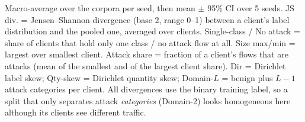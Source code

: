 \begin{table}[t]
\caption{Measured heterogeneity of the client partitions (10 clients) used by the FedAvg runs.}
\label{tab:partition_heterogeneity}
\centering
\small
\setlength{\tabcolsep}{3pt}
\par\smallskip
{\footnotesize Macro-average over the corpora per seed, then mean $\pm$ 95\% CI over 5 seeds. JS div. = Jensen--Shannon divergence (base 2, range 0--1) between a client's label distribution and the pooled one, averaged over clients. Single-class / No attack = share of clients that hold only one class / no attack flow at all. Size max/min = largest over smallest client. Attack share = fraction of a client's flows that are attacks (mean of the smallest and of the largest client share). Dir = Dirichlet label skew; Qty-skew = Dirichlet quantity skew; Domain-$L$ = benign plus $L{-}1$ attack categories per client. All divergences use the binary training label, so a split that only separates attack \emph{categories} (Domain-2) looks homogeneous here although its clients see different traffic.}
\end{table}
